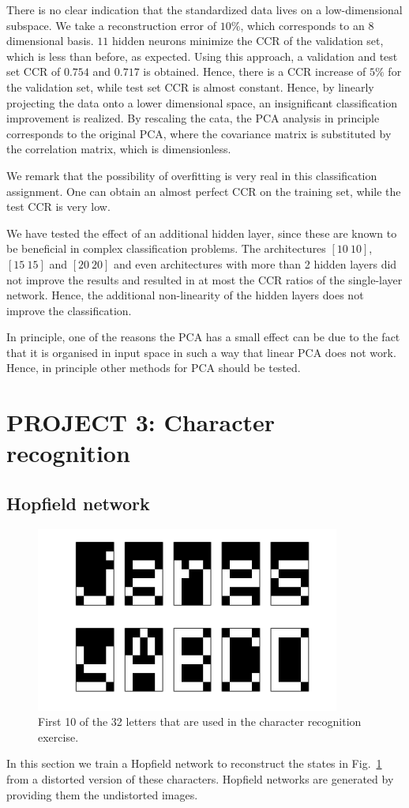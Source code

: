 \documentclass[pdftex,11pt,a4paper]{article}
\begin{document}
There is no clear indication that the standardized data lives on a low-dimensional subspace. We take a reconstruction error of $10\%$, which corresponds to an $8$ dimensional basis. $11$ hidden neurons minimize the CCR of the validation set, which is less than before, as expected. Using this approach, a validation and test set CCR of $0.754$ and $0.717$ is obtained. Hence, there is a CCR increase of $5 \%$ for the validation set, while test set CCR is almost constant.
Hence, by linearly projecting the data onto a lower dimensional space, an insignificant classification improvement is realized. By rescaling the cata, the PCA analysis in principle corresponds to the original PCA, where the covariance matrix is substituted by the correlation matrix, which is dimensionless.

We remark that the possibility of overfitting is very real in this classification assignment. One can obtain an almost perfect CCR on the training set, while the test CCR is very low.

We have tested the effect of an additional hidden layer, since these are known to be beneficial in complex classification problems. The architectures $[10~10]$, $[15~15]$ and $[20~20]$ and even architectures with more than 2 hidden layers did not improve the results and resulted in at most the CCR ratios of the single-layer network. Hence, the additional non-linearity of the hidden layers does not improve the classification.

In principle, one of the reasons the PCA has a small effect can be due to the fact that it is organised in input space in such a way that linear PCA does not work. Hence, in principle other methods for PCA should be tested.

\newpage
\section{PROJECT 3: Character recognition}\label{sec:hopfield}
\subsection{Hopfield network}
\begin{figure}[htb]
\centering
\includegraphics[width=10cm]{figs/letters.png}
\caption{First 10 of the 32 letters that are used in the character recognition exercise.\label{fig:letters}}
\end{figure}
In this section we train a Hopfield network to reconstruct the states in Fig.~\ref{fig:letters} from a distorted version of these characters. Hopfield networks are generated by providing them the undistorted images. 
\end{document}
